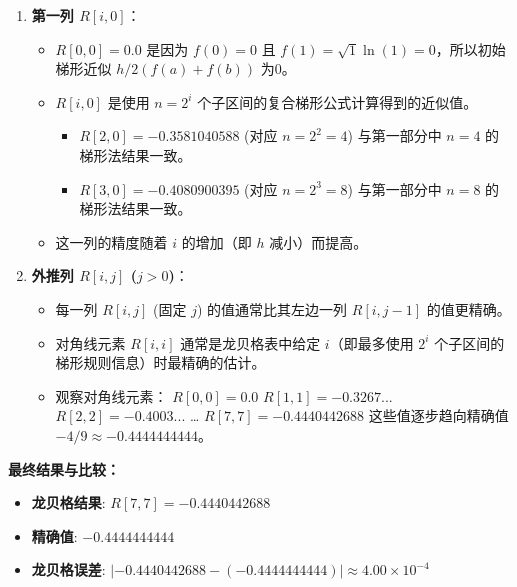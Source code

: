 \documentclass[11pt]{article}
\providecommand{\tightlist}{%
      \setlength{\itemsep}{0pt}\setlength{\parskip}{0pt}}
\begin{document}
\begin{enumerate}
\def\labelenumi{\arabic{enumi}.}
\tightlist
\item
  \textbf{第一列 \(R[i,0]\)}：

  \begin{itemize}
  \tightlist
  \item
    \(R[0,0] = 0.0\) 是因为 \(f(0)=0\) 且
    \(f(1)=\sqrt{1}\ln(1)=0\)，所以初始梯形近似 \(h/2(f(a)+f(b))\) 为0。
  \item
    \(R[i,0]\) 是使用 \(n=2^i\) 个子区间的复合梯形公式计算得到的近似值。

    \begin{itemize}
    \tightlist
    \item
      \(R[2,0] = -0.3581040588\) (对应 \(n=2^2=4\)) 与第一部分中 \(n=4\)
      的梯形法结果一致。
    \item
      \(R[3,0] = -0.4080900395\) (对应 \(n=2^3=8\)) 与第一部分中 \(n=8\)
      的梯形法结果一致。
    \end{itemize}
  \item
    这一列的精度随着 \(i\) 的增加（即 \(h\) 减小）而提高。
  \end{itemize}
\item
  \textbf{外推列 \(R[i,j]\) (\(j>0\))}：

  \begin{itemize}
  \tightlist
  \item
    每一列 \(R[i,j]\) (固定 \(j\)) 的值通常比其左边一列 \(R[i,j-1]\)
    的值更精确。
  \item
    对角线元素 \(R[i,i]\) 通常是龙贝格表中给定 \(i\)（即最多使用 \(2^i\)
    个子区间的梯形规则信息）时最精确的估计。
  \item
    观察对角线元素： \(R[0,0] = 0.0\) \(R[1,1] = -0.3267...\)
    \(R[2,2] = -0.4003...\) \ldots{} \(R[7,7] = -0.4440442688\)
    这些值逐步趋向精确值 \(-4/9 \approx -0.4444444444\)。
  \end{itemize}
\end{enumerate}

\textbf{最终结果与比较：}

\begin{itemize}
\tightlist
\item
  \textbf{龙贝格结果}: \(R[7,7] = -0.4440442688\)
\item
  \textbf{精确值}: \(-0.4444444444\)
\item
  \textbf{龙贝格误差}:
  \(|-0.4440442688 - (-0.4444444444)| \approx 4.00 \times 10^{-4}\)
\end{itemize}
\end{document}
